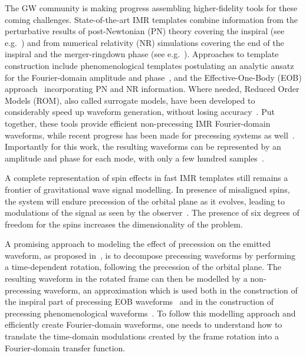 \documentclass[aps,showpacs,twocolumn,
prd,superscriptaddress,nofootinbib]{revtex4-1}
\newcommand{\SM}[1]{{\color{Red} #1}}
\begin{document}
The GW community is making progress assembling higher-fidelity tools for these coming challenges. State-of-the-art IMR templates combine information from the perturbative results of post-Newtonian (PN) theory covering the inspiral (see e.g.~\cite{BlanchetLiving}) and from numerical relativity (NR) simulations covering the end of the inspiral and the merger-ringdown phase (see e.g.~\cite{Pfeiffer12}).  Approaches to template construction include phenomenological templates postulating an analytic ansatz for the Fourier-domain amplitude and phase~\cite{Husa+15, Khan+15,Hannam+13}, and the Effective-One-Body (EOB) approach~\cite{BD99,Taracchini+13, Pan+13, Bohe+16} incorporating PN and NR information. Where needed, Reduced Order Models (ROM), also called surrogate models, have been developed to considerably speed up waveform generation, without losing accuracy~\cite{Field+13, Puerrer14, Blackman+17a}. Put together, these tools provide efficient non-precessing IMR Fourier-domain waveforms, while recent progress has been made for precessing systems as well~\cite{Hannam+13, Chatziioannou+17, Blackman+17b}. Importantly for this work, the resulting waveforms can be represented by an amplitude and phase for each mode, with only a few hundred samples~\cite{Puerrer14}.


A complete representation of spin effects in fast IMR templates still remains a frontier of gravitational wave signal modelling. In presence of misaligned spins, the system will endure precession of the orbital plane as it evolves, leading to modulations of the signal as seen by the observer~\cite{Apostolatos+94, Kidder95}. The presence of six degrees of freedom for the spins increases the dimensionality of the problem.

A promising approach to modeling the effect of precession on the emitted waveform, as proposed in~\cite{BCV03b, BCPTV05, Schmidt+10, OShaughnessy+11, Boyle+11}, is to decompose precessing waveforms by performing a time-dependent rotation, following the precession of the orbital plane. The resulting waveform in the rotated frame can then be modelled by a non-precessing waveform, an approximation which is used both in the construction of the inspiral part of precessing EOB waveforms~\cite{Pan+13} and in the construction of precessing phenomenological waveforms~\cite{Hannam+13}. To follow this modelling approach and efficiently create Fourier-domain waveforms, one needs to understand how to translate the time-domain modulations created by the frame rotation into a Fourier-domain transfer function.
\end{document}
